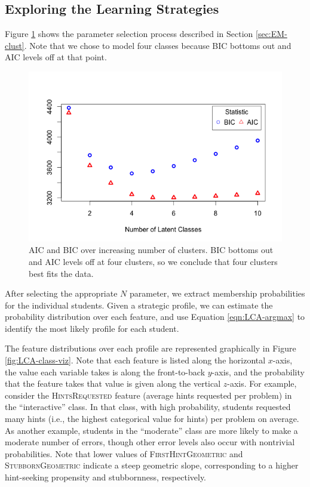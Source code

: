 \documentclass{edm_template}
\newcommand{\ftr}[1]{\textsc{#1}}
\begin{document}
\subsection{Exploring the Learning Strategies}
\label{sec:exploring-classes}

Figure \ref{fig:LCa-test-statistics} shows the parameter selection process described in Section \ref{sec:EM-clust}. Note that we chose to model four classes because BIC bottoms out and AIC levels off at that point.

\begin{figure}[htbp]
\includegraphics[scale=0.4]{LCa-stats-plot.png}
\caption{AIC and BIC over increasing number of clusters. BIC bottoms out and AIC levels off at four clusters, so we conclude that four clusters best fits the data.}
\label{fig:LCa-test-statistics}
\end{figure}

After selecting the appropriate $N$ parameter, we extract membership probabilities for the individual students. Given a strategic profile, we can estimate the probability distribution over each feature, and use Equation \ref{eqn:LCA-argmax} to identify the most likely profile for each student.

The feature distributions over each profile are represented graphically in Figure \ref{fig:LCA-class-viz}. Note that each feature is listed along the horizontal $x$-axis, the value each variable takes is along the front-to-back $y$-axis, and the probability that the feature takes that value is given along the vertical $z$-axis. For example, consider the \ftr{HintsRequested} feature (average hints requested per problem) in the ``interactive'' class. In that class, with high probability, students requested many hints (i.e., the highest categorical value for hints) per problem on average. As another example, students in the ``moderate'' class are more likely to make a moderate number of errors, though other error levels also occur with nontrivial probabilities. Note that lower values of \ftr{FirstHintGeometric} and \ftr{StubbornGeometric} indicate a steep geometric slope, corresponding to a higher hint-seeking propensity and stubbornness, respectively.
\end{document}
